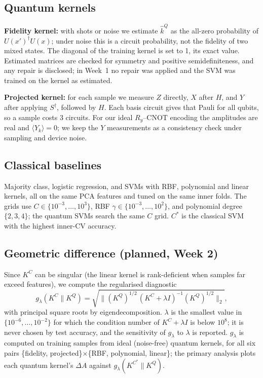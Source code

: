 \documentclass[conference]{IEEEtran}
\begin{document}
\subsection{Quantum kernels}
\textbf{Fidelity kernel:} with shots or noise we estimate $\hat k^{Q}$ as the all-zero probability of $U(x')^\dagger U(x)$; under noise this is a circuit probability, not the fidelity of two mixed states. The diagonal of the training kernel is set to 1, its exact value. Estimated matrices are checked for symmetry and positive semidefiniteness, and any repair is disclosed; in Week~1 no repair was applied and the SVM was trained on the kernel as estimated.

\textbf{Projected kernel:} for each sample we measure $Z$ directly, $X$ after $H$, and $Y$ after applying $S^\dagger$, followed by $H$. Each basis circuit gives that Pauli for all qubits, so a sample costs 3 circuits. For our ideal $R_y$--CNOT encoding the amplitudes are real and $\langle Y_k\rangle=0$; we keep the $Y$ measurements as a consistency check under sampling and device noise.

\subsection{Classical baselines}
Majority class, logistic regression, and SVMs with RBF, polynomial and linear kernels, all on the same PCA features and tuned on the same inner folds. The grids use $C\in\{10^{-3},\dots,10^{3}\}$, RBF $\gamma\in\{10^{-3},\dots,10^{2}\}$, and polynomial degree $\{2,3,4\}$; the quantum SVMs search the same $C$ grid. $C^\ast$ is the classical SVM with the highest inner-CV accuracy.

\subsection{Geometric difference (planned, Week 2)}
Since $K^{C}$ can be singular (the linear kernel is rank-deficient when samples far exceed features), we compute the regularised diagnostic
\begin{equation}
g_\lambda(K^{C}\|K^{Q}) = \sqrt{\Big\|(K^{Q})^{1/2}\,(K^{C}+\lambda I)^{-1}(K^{Q})^{1/2}\Big\|_{2}},
\end{equation}
with principal square roots by eigendecomposition. $\lambda$ is the smallest value in $\{10^{-6},\dots,10^{-2}\}$ for which the condition number of $K^{C}+\lambda I$ is below $10^{8}$; it is never chosen by test accuracy, and the sensitivity of $g_\lambda$ to $\lambda$ is reported. $g_\lambda$ is computed on training samples from ideal (noise-free) quantum kernels, for all six pairs \{fidelity, projected\}$\times$\{RBF, polynomial, linear\}; the primary analysis plots each quantum kernel's $\Delta A$ against $g_\lambda(K^{C^\ast}\|K^{Q})$.
\end{document}
